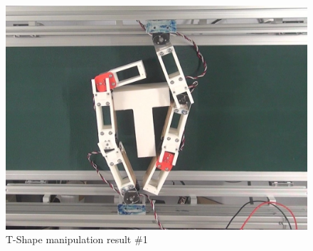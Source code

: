 \documentclass[a4paper,papersize,dvipdfmx]{mtabst}
\begin{document}
\begin{figure}[t]
\begin{minipage}{0.249\linewidth}
\end{minipage}\hfill
\begin{minipage}{0.249\linewidth}
\centering
\includegraphics[width=0.9\linewidth]{fig/4-manipulation-result/TShape/1-4.jpg}
\end{minipage}
\caption{T-Shape manipulation result \#1}\label{fig::tm1}


\end{figure}
\end{document}
